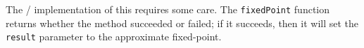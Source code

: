 \begin{chunk}
  The \FORTRAN/ implementation of this requires some care. The
  \verb#fixedPoint# function returns whether the method succeeded or
  failed; if it succeeds, then it will set the \verb#result# parameter
  to the approximate fixed-point.
  
\end{chunk}
